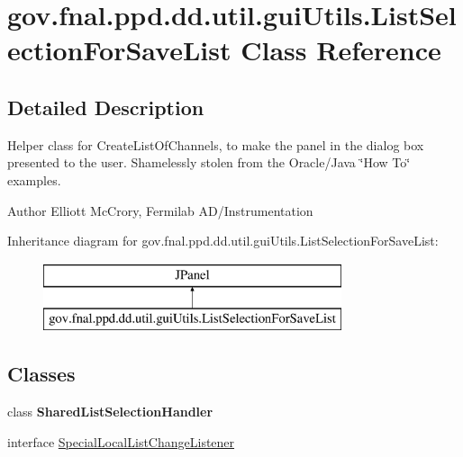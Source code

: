 \hypertarget{classgov_1_1fnal_1_1ppd_1_1dd_1_1util_1_1guiUtils_1_1ListSelectionForSaveList}{\section{gov.\-fnal.\-ppd.\-dd.\-util.\-gui\-Utils.\-List\-Selection\-For\-Save\-List Class Reference}
\label{classgov_1_1fnal_1_1ppd_1_1dd_1_1util_1_1guiUtils_1_1ListSelectionForSaveList}
}


\subsection{Detailed Description}
Helper class for Create\-List\-Of\-Channels, to make the panel in the dialog box presented to the user. Shamelessly stolen from the Oracle/\-Java \char`\"{}\-How To\char`\"{} examples.

\begin{DoxyAuthor}{Author}
Elliott Mc\-Crory, Fermilab A\-D/\-Instrumentation 
\end{DoxyAuthor}
Inheritance diagram for gov.\-fnal.\-ppd.\-dd.\-util.\-gui\-Utils.\-List\-Selection\-For\-Save\-List\-:\begin{figure}[H]
\begin{center}
\leavevmode
\includegraphics[height=2.000000cm]{classgov_1_1fnal_1_1ppd_1_1dd_1_1util_1_1guiUtils_1_1ListSelectionForSaveList}
\end{center}
\end{figure}
\subsection*{Classes}
\begin{DoxyCompactItemize}
\item 
class {\bfseries Shared\-List\-Selection\-Handler}
\item 
interface \hyperlink{interfacegov_1_1fnal_1_1ppd_1_1dd_1_1util_1_1guiUtils_1_1ListSelectionForSaveList_1_1SpecialLocalListChangeListener}{Special\-Local\-List\-Change\-Listener}
\end{DoxyCompactItemize}
